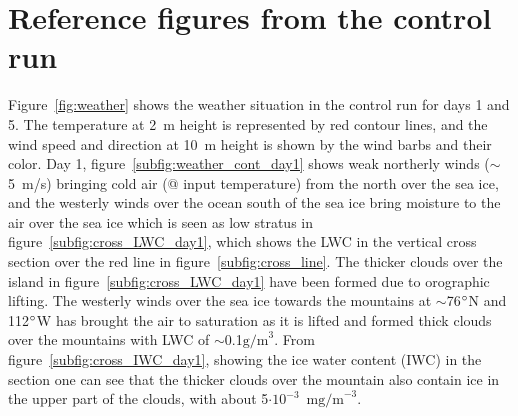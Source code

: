 \section{Reference figures from the control run}
Figure~\ref{fig:weather} shows the weather situation in the control run for days 1 and 5. The temperature at 2~m height is represented by red contour lines, and the wind speed and direction at 10~m height is shown by the 
wind barbs and their color. Day 1, figure~\ref{subfig:weather_cont_day1} shows weak northerly winds ($\sim$ 5~m/s) bringing cold air (@ input temperature) from the north over the sea ice, and the westerly winds over the ocean south of the sea ice bring moisture to the air over the sea ice which is seen as low stratus in figure~\ref{subfig:cross_LWC_day1}, which shows the LWC in the vertical cross section over the red line in figure~\ref{subfig:cross_line}. The thicker clouds over the island in figure~\ref{subfig:cross_LWC_day1} have been formed due to orographic lifting. The westerly winds over the sea ice towards the mountains at $\sim$76$\degree$N and 112$\degree$W has brought the air to saturation as it is lifted and formed thick clouds over the mountains with LWC of $\sim$0.1$\text{g/m}^3$. From figure~\ref{subfig:cross_IWC_day1}, showing the ice water content (IWC) in the section one can see that the thicker clouds over the mountain also contain ice in the upper part of the clouds, with about 5$\cdot\text{10}^{-3}$~$\text{mg/m}^{-3}$. 

